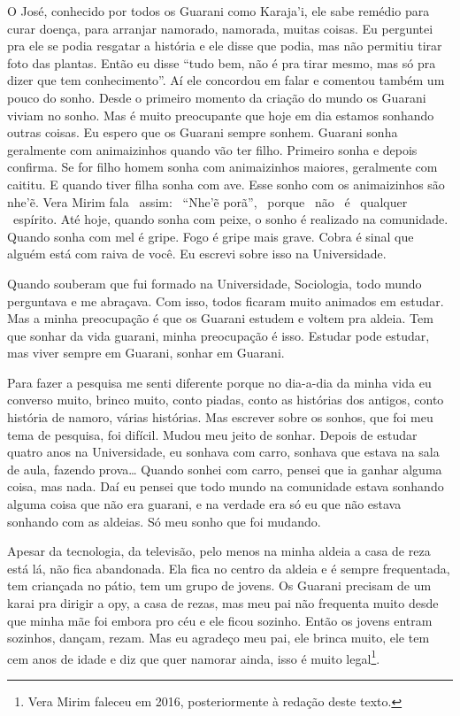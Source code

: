 O José, conhecido por todos os Guarani como Karaja’i, ele sabe remédio
para curar doença, para arranjar namorado, namorada, muitas coisas. Eu
perguntei pra ele se podia resgatar a história e ele disse que podia,
mas não permitiu tirar foto das plantas. Então eu disse ``tudo bem, não
é pra tirar mesmo, mas só pra dizer que tem conhecimento''. Aí ele
concordou em falar e comentou também um pouco do sonho. Desde o
primeiro momento da criação do mundo os Guarani viviam no sonho. Mas é
muito preocupante que hoje em dia estamos sonhando outras coisas. Eu
espero que os Guarani sempre sonhem. Guarani sonha geralmente com
animaizinhos quando vão ter filho. Primeiro sonha e depois confirma. Se
for filho homem sonha com animaizinhos maiores, geralmente com caititu.
E quando tiver filha sonha com ave. Esse sonho com os animaizinhos são
nhe’\~{e}. Vera Mirim fala ~assim: ~``Nhe’\~{e}  porã'', ~porque ~não ~é
~qualquer ~espírito. Até hoje, quando sonha com peixe, o sonho é
realizado na comunidade. Quando sonha com mel é gripe. Fogo é gripe
mais grave. Cobra é sinal que alguém está com raiva de você. Eu escrevi
sobre isso na Universidade.

Quando souberam que fui formado na Universidade, Sociologia, todo mundo
perguntava e me abraçava. Com isso, todos ficaram muito animados em
estudar. Mas a minha preocupação é que os Guarani estudem e voltem pra
aldeia. Tem que sonhar da vida guarani, minha preocupação é isso.
Estudar pode estudar, mas viver sempre em Guarani, sonhar em Guarani.

Para fazer a pesquisa me senti diferente porque no dia-a-dia da minha
vida eu converso muito, brinco muito, conto piadas, conto as histórias
dos antigos, conto história de namoro, várias histórias. Mas escrever
sobre os sonhos, que foi meu tema de pesquisa, foi difícil. Mudou meu
jeito de sonhar. Depois de estudar quatro anos na Universidade, eu
sonhava com carro, sonhava que estava na sala de aula, fazendo prova\ldots{}
Quando sonhei com carro, pensei que ia ganhar alguma coisa, mas nada.
Daí eu pensei que todo mundo na comunidade estava sonhando alguma coisa
que não era guarani, e na verdade era só eu que não estava sonhando com
as aldeias. Só meu sonho que foi mudando.

Apesar da tecnologia, da televisão, pelo menos na minha aldeia a casa de
reza está lá, não fica abandonada. Ela fica no centro da aldeia e é
sempre frequentada, tem criançada no pátio, tem um grupo de jovens. Os
Guarani precisam de um karai pra dirigir a opy, a casa de rezas, mas
meu pai não frequenta muito desde que minha mãe foi embora pro céu e
ele ficou sozinho. Então os jovens entram sozinhos, dançam, rezam. Mas
eu agradeço meu pai, ele brinca muito, ele tem cem anos de idade e diz
que quer namorar ainda, isso é muito legal\footnote{Vera Mirim faleceu
em 2016, posteriormente à redação deste texto.}.

